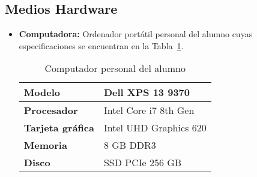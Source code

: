 \subsection{Medios Hardware}
\begin{itemize}
\item \textbf{Computadora:} Ordenador portátil personal del alumno cuyas especificaciones se encuentran en la Tabla~\ref{tab:pc}.
  \begin{table}[H]
        \centering
        \begin{tabular}{|l|l|}
                \hline
                \textbf{Modelo} & Dell XPS 13 9370 \\ \hline
                \textbf{Procesador} & Intel Core i7 8th Gen \\ \hline
                \textbf{Tarjeta gráfica} & Intel UHD Graphics 620 \\ \hline
                \textbf{Memoria} & 8 GB DDR3\\ \hline
                \textbf{Disco} & SSD PCIe 256 GB\\ \hline
        \end{tabular}
        \caption{Computador personal del alumno}
        \label{tab:pc}
\end{table}
\end{itemize}
